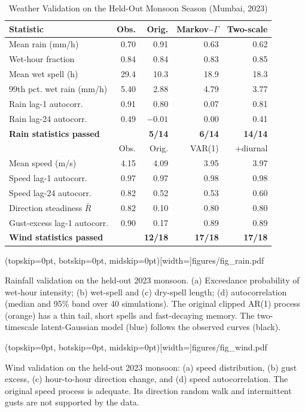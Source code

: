 \documentclass{ieeeaccess}
\newcommand{\widecap}[1]{\parbox[t]{0.89\textwidth}{\raggedright #1}}
\begin{document}
\begin{table}[t]
\caption{Weather Validation on the Held-Out Monsoon Season (Mumbai, 2023)}
\label{tab:weather}
\footnotesize
\setlength{\tabcolsep}{2.2pt}
\begin{tabular}{@{}lrrrr@{}}
\toprule
Statistic & Obs. & Orig. & Markov--$\Gamma$ & Two-scale \\
\midrule
Mean rain (mm/h) & 0.70 & 0.91 & 0.63 & 0.62 \\
Wet-hour fraction & 0.84 & 0.84 & 0.83 & 0.85 \\
Mean wet spell (h) & 29.4 & 10.3 & 18.9 & 18.3 \\
99th pct. wet rain (mm/h) & 5.40 & 2.88 & 4.79 & 3.77 \\
Rain lag-1 autocorr. & 0.91 & 0.80 & 0.07 & 0.81 \\
Rain lag-24 autocorr. & 0.49 & $-0.01$ & 0.00 & 0.41 \\
\textbf{Rain statistics passed} & & \textbf{5/14} & \textbf{6/14} & \textbf{14/14} \\
\midrule
 & Obs. & Orig. & VAR(1) & +diurnal \\
\midrule
Mean speed (m/s) & 4.15 & 4.09 & 3.95 & 3.97 \\
Speed lag-1 autocorr. & 0.97 & 0.97 & 0.98 & 0.98 \\
Speed lag-24 autocorr. & 0.82 & 0.52 & 0.53 & 0.60 \\
Direction steadiness $\bar R$ & 0.82 & 0.10 & 0.80 & 0.80 \\
Gust-excess lag-1 autocorr. & 0.90 & 0.17 & 0.89 & 0.89 \\
\textbf{Wind statistics passed} & & \textbf{12/18} & \textbf{17/18} & \textbf{17/18} \\
\bottomrule
\end{tabular}
\end{table}

\Figure[t!](topskip=0pt, botskip=0pt, midskip=0pt)[width=\textwidth]{figures/fig_rain.pdf}
{\widecap{Rainfall validation on the held-out 2023 monsoon. (a) Exceedance probability of wet-hour intensity; (b) wet-spell and (c) dry-spell length; (d) autocorrelation (median and 95\% band over 40 simulations). The original clipped AR(1) process (orange) has a thin tail, short spells and fast-decaying memory. The two-timescale latent-Gaussian model (blue) follows the observed curves (black).}\label{fig:rain}}

\Figure[t!](topskip=0pt, botskip=0pt, midskip=0pt)[width=\textwidth]{figures/fig_wind.pdf}
{\widecap{Wind validation on the held-out 2023 monsoon: (a) speed distribution, (b) gust excess, (c) hour-to-hour direction change, and (d) speed autocorrelation. The original speed process is adequate. Its direction random walk and intermittent gusts are not supported by the data.}\label{fig:wind}}
\end{document}
